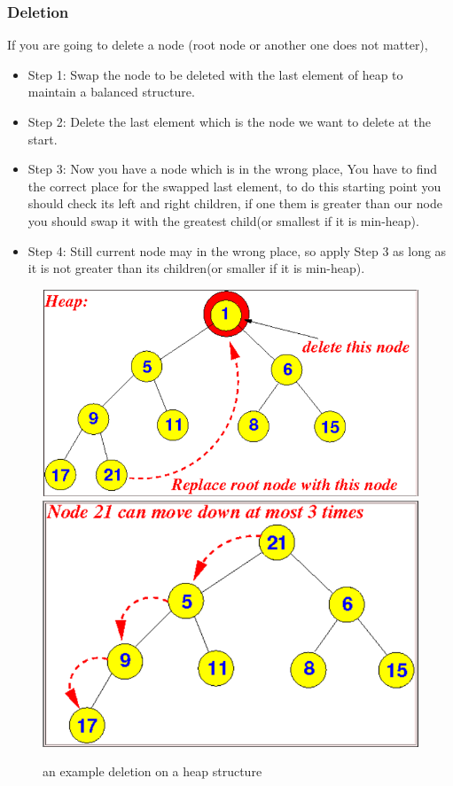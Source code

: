 \documentclass[12pt]{article}
\begin{document}
     \subsubsection{Deletion}
        If you are going to delete a node (root node or another one does not matter), 
        \begin{itemize}
            \item Step 1:  Swap the node to be deleted with the last element of heap to maintain a balanced structure.
            \item Step 2: Delete the last element which is the node we want to delete at the start.
            \item Step 3: Now you have a node which is in the wrong place, You have to find the correct place for the swapped last element, to do this starting point you should check its left and right children, if one them is greater than our node you should swap it with the greatest child(or smallest if it is min-heap).
            \item Step 4: Still current node may in the wrong place, so apply Step 3 as long as it is not greater than its children(or smaller if it is min-heap).
        \end{itemize}
        \begin{figure}[h]
        \includegraphics[width=\linewidth/2 ]{heap1.png} \includegraphics[width=\linewidth/2 ]{heap2.png}
        \caption{an example deletion on a heap structure}
    \end{figure}
\end{document}
